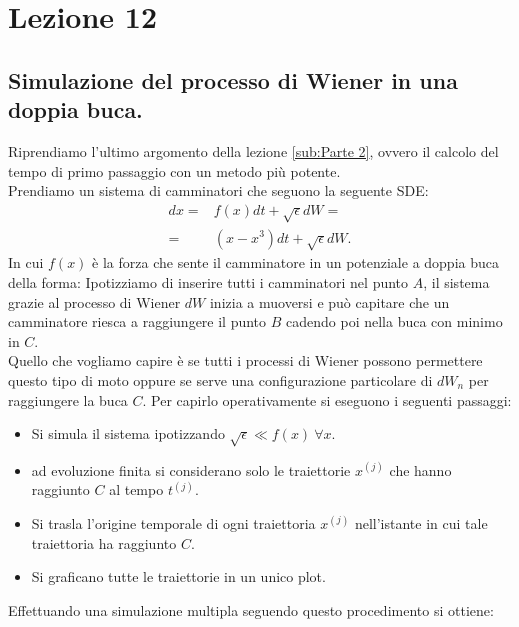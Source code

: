 \section{Lezione 12}%
\label{sub:Lezione 12}
\subsection{Simulazione del processo di Wiener in una doppia buca.}%
\label{sub:Simulazione dei camminatori.}
Riprendiamo l'ultimo argomento della lezione \ref{sub:Parte 2}, ovvero il calcolo del tempo di primo passaggio con un metodo più potente. \\
Prendiamo un sistema di camminatori che seguono la seguente SDE:
\begin{equation}
\begin{aligned}
    dx = & f(x) dt + \sqrt{\epsilon} dW = \\
    = & \left(x-x^3\right)dt + \sqrt{\epsilon} dW
.\end{aligned}
\label{eq:12_beg}
\end{equation}
In cui $f(x)$ è la forza che sente il camminatore in un potenziale a doppia buca della forma:
%
\noindent
Ipotizziamo di inserire tutti i camminatori nel punto $A$, il sistema grazie al processo di Wiener $dW$ inizia a muoversi e può capitare che un camminatore riesca a raggiungere il punto $B$ cadendo poi nella buca con minimo in $C$. \\
Quello che vogliamo capire è se tutti i processi di Wiener possono permettere questo tipo di moto oppure se serve una configurazione particolare di $dW_n$ per raggiungere la buca $C$. Per capirlo operativamente si eseguono i seguenti passaggi:
\begin{itemize}
    \item Si simula il sistema ipotizzando $\sqrt{\epsilon} \ll f(x) \ \forall x$.
    \item ad evoluzione finita si considerano solo le traiettorie $x^{(j)}$ che hanno raggiunto $C$ al tempo $t^{(j)}$.
    \item Si trasla l'origine temporale di ogni traiettoria $x^{(j)}$ nell'istante in cui tale traiettoria ha raggiunto $C$.
    \item Si graficano tutte le traiettorie in un unico plot.
\end{itemize}
Effettuando una simulazione multipla seguendo questo procedimento si ottiene:
